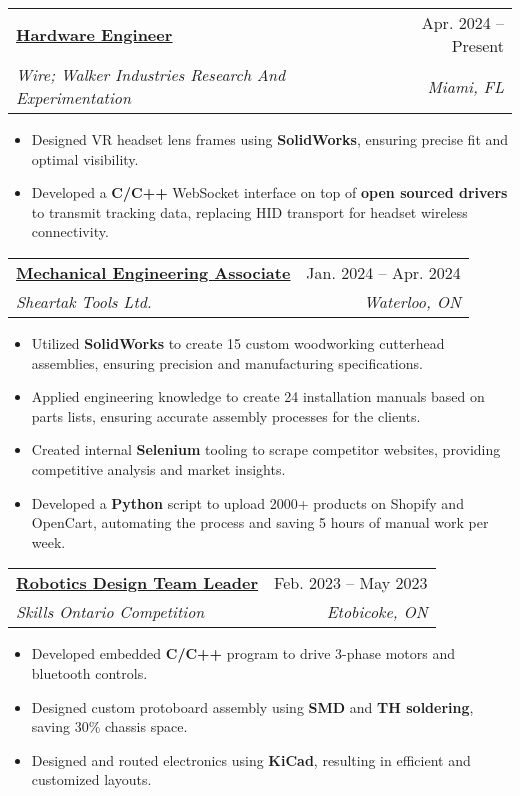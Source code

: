 \documentclass[letterpaper]{article}
\makeatletter
\newcommand{\resumeItem}[1]{
  \item\small{
    {#1 \vspace{-2pt}}
  }
}
\newcommand{\resumeSubheading}[4]{
  \vspace{-2pt}\item
    \begin{tabular*}{0.97\textwidth}[t]{l@{\extracolsep{\fill}}r}
      \textbf{#1} & #2 \\
      \textit{\small#3} & \textit{\small #4} \\
    \end{tabular*}\vspace{-7pt}
}
\newcommand{\resumeItemListStart}{\begin{itemize}}
\newcommand{\resumeItemListEnd}{\end{itemize}\vspace{-5pt}}
\makeatother
\begin{document}
    \resumeSubheading
      {\underline{\href{https://www.walkerindustries.xyz/}{Hardware Engineer}}}{Apr. 2024 -- Present}
      {Wire; Walker Industries Research And Experimentation}{Miami, FL}
      \resumeItemListStart
        \resumeItem{Designed VR headset lens frames using \textbf{SolidWorks}, ensuring precise fit and optimal visibility.}
        \resumeItem{Developed a \textbf{C/C++} WebSocket interface on top of \textbf{open sourced drivers} to transmit tracking data, replacing HID transport for headset wireless connectivity.}
      \resumeItemListEnd

    \resumeSubheading
      {\underline{\href{https://www.gavintranquilino.com/sheartak.html}{Mechanical Engineering Associate}}}{Jan. 2024 -- Apr. 2024}
      {Sheartak Tools Ltd.}{Waterloo, ON}
      \resumeItemListStart
        \resumeItem{Utilized \textbf{SolidWorks} to create 15 custom woodworking cutterhead assemblies, ensuring precision and manufacturing specifications.}
        \resumeItem{Applied engineering knowledge to create 24 installation manuals based on parts lists, ensuring accurate assembly processes for the clients.}
        \resumeItem{Created internal \textbf{Selenium} tooling to scrape competitor websites, providing competitive analysis and market insights.}
        \resumeItem{Developed a \textbf{Python} script to upload 2000+ products on Shopify and OpenCart, automating the process and saving 5 hours of manual work per week.}
      \resumeItemListEnd

    \resumeSubheading
      {\underline{\href{https://www.gavintranquilino.com/hockey-robot.html}{Robotics Design Team Leader}}}{Feb. 2023 -- May 2023}
      {Skills Ontario Competition}{Etobicoke, ON}
      \resumeItemListStart
        \resumeItem{Developed embedded \textbf{C/C++} program to drive 3-phase motors and bluetooth controls.}
        \resumeItem{Designed custom protoboard assembly using \textbf{SMD} and \textbf{TH soldering}, saving 30\% chassis space.}
        \resumeItem{Designed and routed electronics using \textbf{KiCad}, resulting in efficient and customized layouts.}
    \resumeItemListEnd
    
\end{document}
